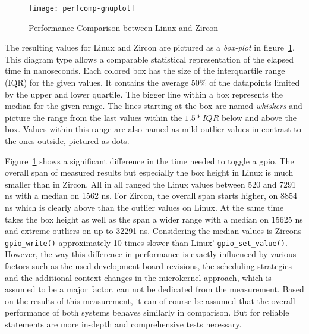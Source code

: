 \begin{figure} [t]
    \centering
    \texttt{[image: perfcomp-gnuplot]}
    \caption{Performance Comparison between Linux and Zircon}\label{pic:perftest}
\end{figure}

The resulting values for Linux and Zircon are pictured as a \textit{box-plot} in figure~\ref{pic:perftest}.
This diagram type allows a comparable statistical representation of the elapsed time in nanoseconds.
Each colored box has the size of the interquartile range (IQR) for the given values.
It contains the average 50\% of the datapoints limited by the upper and lower quartile.
The bigger line within a box represents the median for the given range.
The lines starting at the box are named \textit{whiskers} and picture the range from the last values within the $1.5 * IQR$ below and above the box.
Values within this range are also named as mild outlier values in contrast to the ones outside, pictured as dots. 

Figure~\ref{pic:perftest} shows a significant difference in the time needed to toggle a \ac{gpio}.
The overall span of measured results but especially the box height in Linux is much smaller than in Zircon.
All in all ranged the Linux values between 520 and 7291 ns with a median on 1562 ns.
For Zircon, the overall span starts higher, on 8854 ns which is clearly above than the outlier values on Linux.
At the same time takes the box height as well as the span a wider range with a median on 15625 ns and extreme outliers on up to 32291 ns.
Considering the median values is Zircons \texttt{gpio_write()} approximately 10 times slower than Linux' \texttt{gpio_set_value()}.
However, the way this difference in performance is exactly influenced by various factors such as the used development board revisions, the scheduling strategies and the additional context changes in the microkernel approach, which is assumed to be a major factor, can not be dedicated from the measurement.
Based on the results of this measurement, it can of course be assumed that the overall performance of both systems behaves similarly in comparison.
But for reliable statements are more in-depth and comprehensive tests necessary.

